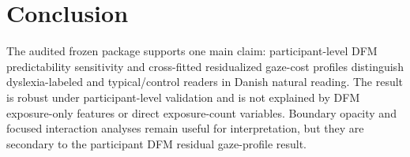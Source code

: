 \section{Conclusion}
The audited frozen package supports one main claim: participant-level DFM
predictability sensitivity and cross-fitted residualized gaze-cost profiles distinguish
dyslexia-labeled and typical/control readers in Danish natural reading. The result is
robust under participant-level validation and is not explained by DFM exposure-only
features or direct exposure-count variables. Boundary opacity and focused interaction
analyses remain useful for interpretation, but they are secondary to the participant
DFM residual gaze-profile result.
